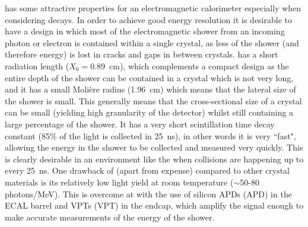 \PbWO has some attractive properties for an electromagnetic calorimeter especially when considering \Hgg decays. In order to achieve good energy resolution it is desirable to have a design in which most of the electromagnetic shower from an incoming photon or electron is contained within a single crystal, as less of the shower (and therefore energy) is lost in cracks and gaps in between crystals. \PbWO has a short radiation length ($X_{0}=0.89$~cm), which complements a compact design as the entire depth of the shower can be contained in a crystal which is not very long, and it has a small Moli\`{e}re radius (1.96~cm) which means that the lateral size of the shower is small. This generally means that the cross-sectional size of a crystal can be small (yielding high granularity of the detector) whilst still containing a large percentage of the shower. It has a very short scintillation time decay constant (85\% of the light is collected in 25~ns), in other words it is very ``fast", allowing the energy in the shower to be collected and measured very quickly. This is clearly desirable in an environment like the \LHC when collisions are happening up to every 25~ns. One drawback of \PbWO (apart from expense) compared to other crystal materials is its relatively low light yield at room temperature ($\sim$50-80 photons/MeV). This is overcome at \CMS with the use of silicon \aclp{APD} (\acs{APD}) in the ECAL barrel and \aclp{VPT} (\acs{VPT}) in the endcap, which amplify the signal enough to make accurate measurements of the energy of the shower. 

